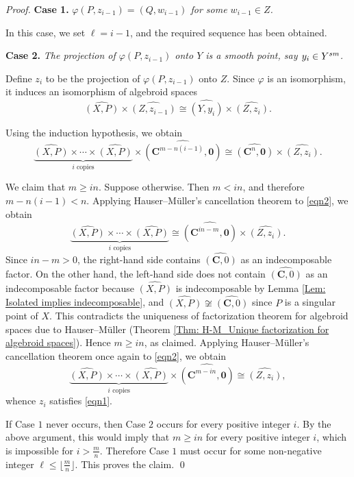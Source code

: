 \documentclass[10pt,a4paper]{amsart}
\numberwithin{equation}{section}
\numberwithin{figure}{section}
\numberwithin{equation}{section}
\newcommand{\C}{\mathbf{C}}
\newcommand{\oo}{\mathbf{0}}
\begin{document}
\begin{proof}
\medskip

\textbf{Case 1.} \emph{$\varphi(P,z_{i-1})=(Q,w_{i-1})$ for some $w_{i-1}\in Z$.}

\smallskip

In this case, we set $\ell=i-1$, and the required sequence has been obtained.

\medskip

\textbf{Case 2.} \emph{The projection of $\varphi(P,z_{i-1})$ onto $Y$ is a smooth point, say $y_i\in Y^{\rm sm}$.}

\smallskip

Define $z_i$ to be the projection of $\varphi(P,z_{i-1})$ onto $Z$. Since $\varphi$ is an isomorphism, it induces an isomorphism of algebroid spaces
\[
\widehat{(X,P)}
\times
\widehat{(Z,z_{i-1})}
\cong
\widehat{(Y,y_i)}
\times
\widehat{(Z,z_i)}.
\]

Using the induction hypothesis, we obtain
\begin{equation}\label{eqn2}
\underbrace{\widehat{(X,P)}\times \cdots \times \widehat{(X,P)}}_{i\text{ copies}}
\times
\widehat{(\C^{m-n(i-1)},\oo)}
\cong
\widehat{(\C^n,\oo)}
\times
\widehat{(Z,z_i)}.
\end{equation}

We claim that $m\geq in$. Suppose otherwise. Then $m<in$, and therefore $m-n(i-1)<n$. Applying Hauser--M\"uller's cancellation theorem \cite[Theorem 1]{HM1990} to \eqref{eqn2}, we obtain
\[
\underbrace{\widehat{(X,P)}\times \cdots \times \widehat{(X,P)}}_{i\text{ copies}}
\cong
\widehat{(\C^{in-m},\oo)}
\times
\widehat{(Z,z_i)}.
\]
Since $in-m>0$, the right-hand side contains $\widehat{(\C,0)}$ as an indecomposable factor. On the other hand, the left-hand side does not contain $\widehat{(\C,0)}$ as an indecomposable factor because $\widehat{(X,P)}$ is indecomposable by Lemma \ref{Lem: Isolated implies indecomposable}, and $\widehat{(X,P)}\not\cong \widehat{(\C,0)}$ since $P$ is a singular point of $X$. This contradicts the uniqueness of factorization theorem for algebroid spaces due to Hauser--M\"uller (Theorem \ref{Thm: H-M_Unique factorization for algebroid spaces}). Hence $m\geq in$, as claimed. Applying Hauser--M\"uller's cancellation theorem once again to \eqref{eqn2}, we obtain
\[
\underbrace{\widehat{(X,P)}\times \cdots \times \widehat{(X,P)}}_{i\text{ copies}}
\times
\widehat{(\C^{m-in},\oo)}
\cong
\widehat{(Z,z_i)},
\]
whence $z_i$ satisfies \eqref{eqn1}.

If Case $1$ never occurs, then Case $2$ occurs for every positive integer $i$. By the above argument, this would imply that $m\geq in$ for every positive integer $i$, which is impossible for $i>\frac{m}{n}$. Therefore Case $1$ must occur for some non-negative integer $\ell\leq \lfloor \frac{m}{n}\rfloor$. This proves the claim.
\qed


\end{proof}
\end{document}
